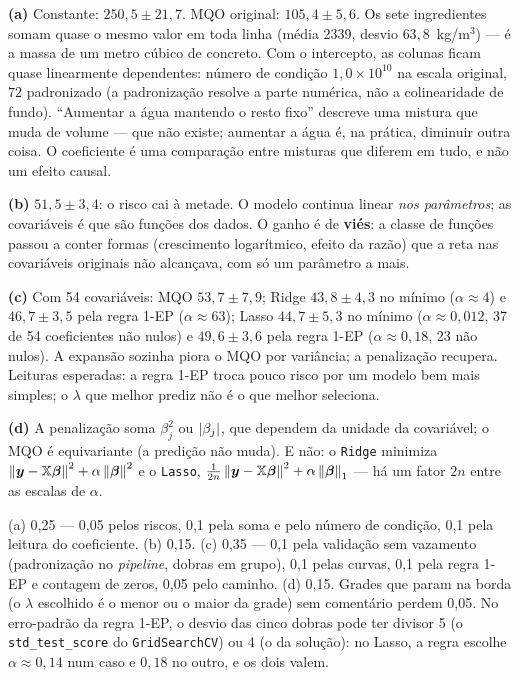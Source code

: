 \documentclass[11pt,a4paper]{article}
\newcommand{\cod}[1]{\texttt{#1}}
\begin{document}
\begin{solucao}
\textbf{(a)} Constante: $250{,}5\pm21{,}7$. MQO original: $105{,}4\pm5{,}6$. Os sete
ingredientes somam quase o mesmo valor em toda linha (média 2339, desvio
$63{,}8$~kg/m$^3$) --- é a massa de um metro cúbico de concreto. Com o intercepto, as
colunas ficam quase linearmente dependentes: número de condição $1{,}0\times10^{10}$
na escala original, $72$ padronizado (a padronização resolve a parte numérica, não a
colinearidade de fundo). ``Aumentar a água mantendo o resto fixo'' descreve uma
mistura que muda de volume --- que não existe; aumentar a água é, na prática,
diminuir outra coisa. O coeficiente é uma comparação entre misturas que diferem em
tudo, e não um efeito causal.

\textbf{(b)} $51{,}5\pm3{,}4$: o risco cai à metade. O modelo continua linear
\emph{nos parâmetros}; as covariáveis é que são funções dos dados. O ganho
é de \textbf{viés}: a classe de funções passou a conter formas (crescimento
logarítmico, efeito da razão) que a reta nas covariáveis originais não alcançava,
com só um parâmetro a mais.

\textbf{(c)} Com 54 covariáveis: MQO $53{,}7\pm7{,}9$; Ridge $43{,}8\pm4{,}3$ no
mínimo ($\alpha\approx4$) e $46{,}7\pm3{,}5$ pela regra 1-EP ($\alpha\approx63$); Lasso
$44{,}7\pm5{,}3$ no mínimo ($\alpha\approx0{,}012$, 37 de 54 coeficientes não nulos) e
$49{,}6\pm3{,}6$ pela regra 1-EP ($\alpha\approx0{,}18$, 23 não nulos). A expansão
sozinha piora o MQO por variância; a penalização recupera. Leituras esperadas: a regra
1-EP troca pouco risco por um modelo bem mais simples; o $\lambda$ que melhor prediz
não é o que melhor seleciona.

\textbf{(d)} A penalização soma $\beta_j^2$ ou $\left\lvert \beta_j \right\rvert$, que dependem da
unidade da covariável; o MQO é equivariante (a predição não muda). E não: o
\cod{Ridge} minimiza $\left\lVert \bm y-\mathbb X\bm{\beta} \right\rVert^2+\alpha\left\lVert \bm{\beta} \right\rVert^2$ e o
\cod{Lasso}, $\frac1{2n}\left\lVert \bm y-\mathbb X\bm{\beta} \right\rVert^2+\alpha\left\lVert \bm{\beta} \right\rVert_1$ --- há um
fator $2n$ entre as escalas de $\alpha$.
\end{solucao}

\begin{criterio}
(a) 0,25 --- 0,05 pelos riscos, 0,1 pela soma e pelo número de condição, 0,1 pela
leitura do coeficiente. (b) 0,15. (c) 0,35 --- 0,1 pela validação sem vazamento
(padronização no \emph{pipeline}, dobras em grupo), 0,1 pelas curvas, 0,1 pela regra
1-EP e contagem de zeros, 0,05 pelo caminho. (d) 0,15. Grades que param na borda
(o $\lambda$ escolhido é o menor ou o maior da grade) sem comentário perdem 0,05. No
erro-padrão da regra 1-EP, o desvio das cinco dobras pode ter divisor 5 (o
\cod{std\_test\_score} do \cod{GridSearchCV}) ou 4 (o da solução): no Lasso, a regra
escolhe $\alpha\approx0{,}14$ num caso e $0{,}18$ no outro, e os dois valem.
\end{criterio}
\end{document}
